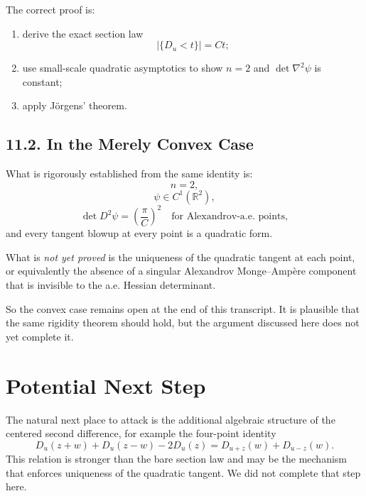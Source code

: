 \documentclass[11pt]{article}
\begin{document}
The correct proof is:
\begin{enumerate}[label=\arabic*.]
\item derive the exact section law
\[
|\{D_u<t\}|=Ct;
\]
\item use small-scale quadratic asymptotics to show $n=2$ and $\det \nabla^2\psi$ is constant;
\item apply J\"orgens' theorem.
\end{enumerate}

\subsection*{11.2. In the Merely Convex Case}

What is rigorously established from the same identity is:
\[
n=2,
\]
\[
\psi\in C^1(\mathbb{R}^2),
\]
\[
\det D^2\psi = \left(\frac{\pi}{C}\right)^2
\quad\text{for Alexandrov-a.e. points},
\]
and every tangent blowup at every point is a quadratic form.

What is \emph{not yet proved} is the uniqueness of the quadratic tangent at each point, or equivalently the absence of a singular Alexandrov Monge--Amp\`ere component that is invisible to the a.e. Hessian determinant.

So the convex case remains open at the end of this transcript. It is plausible that the same rigidity theorem should hold, but the argument discussed here does not yet complete it.

\section*{Potential Next Step}

The natural next place to attack is the additional algebraic structure of the centered second difference, for example the four-point identity
\[
D_u(z+w)+D_u(z-w)-2D_u(z)=D_{u+z}(w)+D_{u-z}(w).
\]
This relation is stronger than the bare section law and may be the mechanism that enforces uniqueness of the quadratic tangent. We did not complete that step here.
\end{document}
